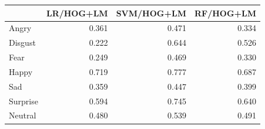 \begin{tabular}{lrrr}
\toprule
 & LR/HOG+LM & SVM/HOG+LM & RF/HOG+LM \\
\midrule
Angry & 0.361 & 0.471 & 0.334 \\
Disgust & 0.222 & 0.644 & 0.526 \\
Fear & 0.249 & 0.469 & 0.330 \\
Happy & 0.719 & 0.777 & 0.687 \\
Sad & 0.359 & 0.447 & 0.399 \\
Surprise & 0.594 & 0.745 & 0.640 \\
Neutral & 0.480 & 0.539 & 0.491 \\
\bottomrule
\end{tabular}
